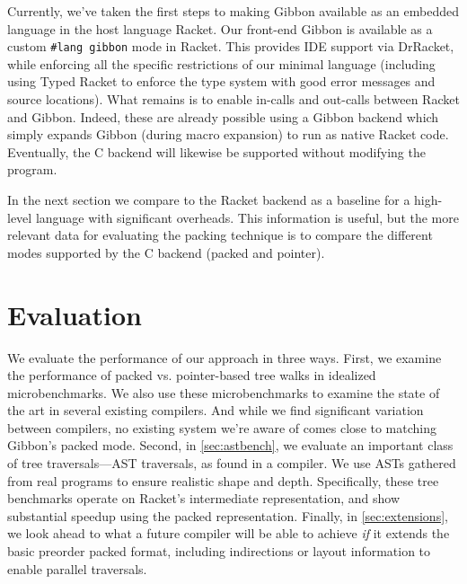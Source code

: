 \documentclass[a4paper,english]{lipics-v2016}
\newcommand{\treelang}{Gibbon\xspace} %
\begin{document}
Currently, we've taken the first steps to making \treelang available as an
embedded language in the host language Racket.
%
Our front-end \treelang is available as a custom \verb|#lang gibbon| mode in
Racket.  This provides IDE support via DrRacket, while enforcing all the
specific restrictions of our minimal language (including using Typed Racket to
enforce the type system with good error messages and source locations).
%
What remains is to enable in-calls and out-calls between Racket and Gibbon.
%
Indeed, these are already possible using a Gibbon backend which simply expands
Gibbon (during macro expansion) to run as native Racket code.  Eventually, the C
backend will likewise be supported without modifying the program.
%

In the next section we compare to the Racket backend as a baseline for a
high-level language with significant overheads.  This information is useful, but
the more relevant data for evaluating the packing technique is to compare the
different modes supported by the C backend (packed and pointer).


\section{Evaluation}\label{sec:eval}

We evaluate the performance of our approach in three ways. First, we examine the
performance of packed vs. pointer-based tree walks in idealized microbenchmarks.
We also use these microbenchmarks to examine the state of the art in several
existing compilers.  And while we find significant variation between compilers,
no existing system we're aware of comes close to matching \treelang's packed
mode.
%
%
Second, in \cref{sec:astbench}, we evaluate an important class of tree
traversals---AST traversals, as found in a compiler.
%
We use ASTs gathered from real programs to ensure realistic shape and depth.
%
Specifically, these tree benchmarks operate on Racket's intermediate
representation, and show {substantial speedup} using the packed
representation.
% 
%
Finally, in \cref{sec:extensions}, we look ahead to what a future compiler
will be able to achieve {\em if} it extends the basic preorder packed format,
including indirections or layout information to enable parallel traversals.
\end{document}
